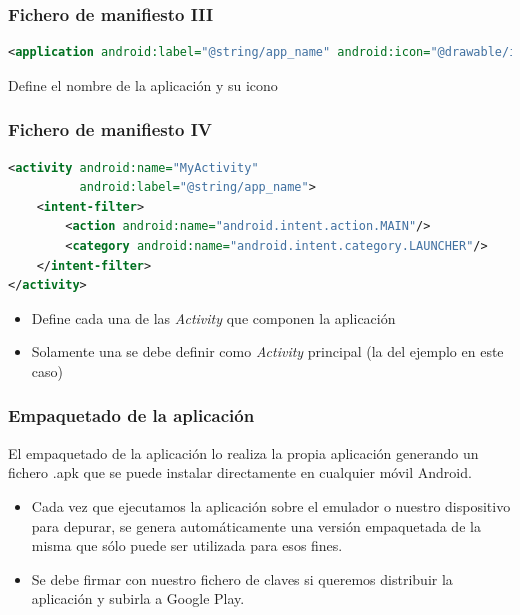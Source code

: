 \documentclass[xcolor={dvipsnames}]{beamer}
\begin{document}
\begin{frame}[fragile]\frametitle{Fichero de manifiesto III}
    \begin{block}{}
    \begin{lstlisting}[language=XML]
<application android:label="@string/app_name" android:icon="@drawable/ic_launcher">
    \end{lstlisting}
    \end{block}
    \begin{block}{}
    Define el nombre de la aplicación y su icono
    \end{block}
\end{frame}

\begin{frame}[fragile]\frametitle{Fichero de manifiesto IV}
    \begin{block}{}
    \begin{lstlisting}[language=XML]
<activity android:name="MyActivity"
          android:label="@string/app_name">
    <intent-filter>
        <action android:name="android.intent.action.MAIN"/>
        <category android:name="android.intent.category.LAUNCHER"/>
    </intent-filter>
</activity>
    \end{lstlisting}
    \end{block}
    \begin{block}{}
    \begin{itemize}
        \item Define cada una de las \emph{Activity} que componen la aplicación
        \item Solamente una se debe definir como \emph{Activity} principal (la del ejemplo en este caso)
    \end{itemize}
    \end{block}
\end{frame}

\begin{frame}\frametitle{Empaquetado de la aplicación}
    \begin{block}{}
    El empaquetado de la aplicación lo realiza la propia aplicación generando un fichero .apk que se puede instalar directamente en
    cualquier móvil Android.
    \end{block}
    \begin{itemize}
        \item Cada vez que ejecutamos la aplicación sobre el emulador o nuestro dispositivo para depurar, se genera automáticamente una
        versión empaquetada de la misma que sólo puede ser utilizada para esos fines.
        \item Se debe firmar con nuestro fichero de claves si queremos distribuir la aplicación y subirla a Google Play.
    \end{itemize}
\end{frame}
\end{document}
